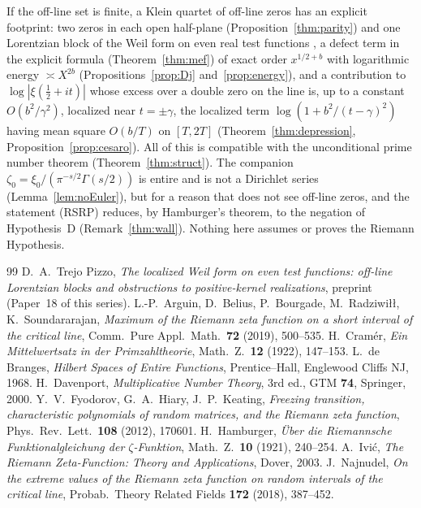 \documentclass[11pt]{amsart}
\theoremstyle{definition}
\theoremstyle{remark}
\newcommand{\half}{\tfrac12}
\begin{document}
If the off-line set is finite, a Klein quartet of off-line zeros has an explicit footprint:
two zeros in each open half-plane (Proposition~\ref{thm:parity}) and one Lorentzian block of
the Weil form on even real test functions \cite{Index}, a defect term in the explicit formula (Theorem~\ref{thm:mef}) of exact order
$x^{1/2+b}$ with logarithmic energy $\asymp X^{2b}$ (Propositions~\ref{prop:Dj}
and~\ref{prop:energy}), and a contribution to $\log|\xi(\half+it)|$ whose excess over a double
zero on the line is, up to a constant $O(b^2/\gamma^2)$, localized near $t=\pm\gamma$, the
localized term $\log(1+b^2/(t-\gamma)^2)$ having mean square $O(b/T)$ on $[T,2T]$
(Theorem~\ref{thm:depression}, Proposition~\ref{prop:cesaro}). All of this is compatible with
the unconditional prime number theorem (Theorem~\ref{thm:struct}). The companion
$\zeta_0=\xi_0/(\pi^{-s/2}\Gamma(s/2))$ is entire and is not a Dirichlet series
(Lemma~\ref{lem:noEuler}), but for a reason that does not see off-line zeros, and the statement
(RSRP) reduces, by Hamburger's theorem, to the negation of Hypothesis~D
(Remark~\ref{thm:wall}). Nothing here assumes or proves the Riemann Hypothesis.

\begin{thebibliography}{99}
 D.~A.~Trejo Pizzo, \emph{The localized Weil form on even test
functions: off-line Lorentzian blocks and obstructions to positive-kernel realizations}, preprint (Paper~18 of this series).
 L.-P.~Arguin, D.~Belius, P.~Bourgade, M.~Radziwi\l\l, K.~Soundararajan,
\emph{Maximum of the Riemann zeta function on a short interval of the critical line}, Comm.\
Pure Appl.\ Math.\ \textbf{72} (2019), 500--535.
 H.~Cram\'er, \emph{Ein Mittelwertsatz in der Primzahltheorie}, Math.\ Z.\
\textbf{12} (1922), 147--153.
\bibitem{deBranges} L.~de Branges, \emph{Hilbert Spaces of Entire Functions}, Prentice--Hall,
Englewood Cliffs NJ, 1968.
\bibitem{Davenport} H.~Davenport, \emph{Multiplicative Number Theory}, 3rd ed., GTM \textbf{74},
Springer, 2000.
\bibitem{FHK} Y.~V.~Fyodorov, G.~A.~Hiary, J.~P.~Keating, \emph{Freezing transition,
characteristic polynomials of random matrices, and the Riemann zeta function}, Phys.\ Rev.\
Lett.\ \textbf{108} (2012), 170601.
\bibitem{Hamburger} H.~Hamburger, \emph{\"Uber die Riemannsche Funktionalgleichung der
$\zeta$-Funktion}, Math.\ Z.\ \textbf{10} (1921), 240--254.
\bibitem{Ivic} A.~Ivi\'c, \emph{The Riemann Zeta-Function: Theory and Applications}, Dover, 2003.
\bibitem{Najnudel} J.~Najnudel, \emph{On the extreme values of the Riemann zeta function on
random intervals of the critical line}, Probab.\ Theory Related Fields \textbf{172} (2018),
387--452.
\end{thebibliography}
\end{document}
